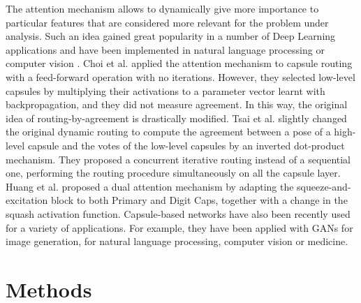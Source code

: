 \documentclass{article}
\begin{document}
The attention mechanism allows to dynamically give more importance to particular features that are considered more relevant for the problem under analysis. Such an idea gained great popularity in a number of Deep Learning applications and have been implemented in natural language processing \cite{bahdanau2014neural,vaswani2017attention} or computer vision \cite{jaderberg2015spatial,xu2015show,hu2018squeeze,woo2018cbam, salvetti2020multi}. Choi et al.\cite{choi2019attention} applied the attention mechanism to capsule routing with a feed-forward operation with no iterations. However, they selected low-level capsules by multiplying their activations to a parameter vector learnt with backpropagation, and they did not measure agreement. In this way, the original idea of routing-by-agreement is drastically modified. Tsai et al.\cite{tsai2020capsules} slightly changed the original dynamic routing to compute the agreement between a pose of a high-level capsule and the votes of the low-level capsules by an inverted dot-product mechanism. They proposed a concurrent iterative routing instead of a sequential one, performing the routing procedure simultaneously on all the capsule layer. Huang et al.\cite{huang2020capsnet} proposed a dual attention mechanism by adapting the squeeze-and-excitation block \cite{hu2018squeeze} to both Primary and Digit Caps, together with a change in the squash activation function. Capsule-based networks have also been recently used for a variety of applications. For example, they have been applied with GANs for image generation\cite{jaiswal2018capsulegan}, for natural language processing\cite{mcintosh2018multi,zhang2018attention,du2019novel}, computer vision\cite{duarte2018videocapsulenet,lalonde2018capsules,nguyen2019capsule} or medicine\cite{mobiny2019automated,kruthika2019cbir}. 

\section{Methods}
\end{document}
